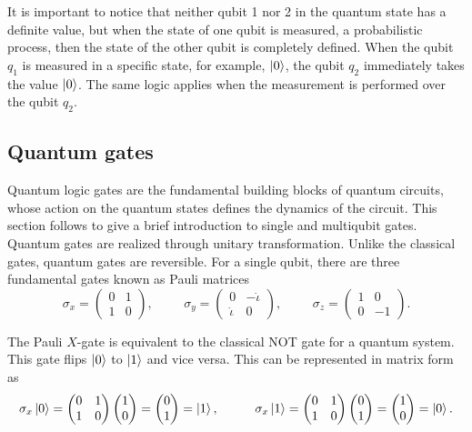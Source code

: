 \documentclass[10pt]{article}
\begin{document}
	It is important to notice that neither qubit 1 nor 2 in the quantum state has a definite value, but when the state of one qubit is measured, a probabilistic process, then the state of the other qubit is completely defined. When the qubit $q_1$ is measured in a specific state, for example, $\ket{0}$, the qubit $q_2$ immediately takes the value $\ket{0}$. The same logic applies when the measurement is performed over the qubit $q_2$.
	\subsection{\label{app: Quantum gates}Quantum gates}
	Quantum logic gates are the fundamental building blocks of quantum circuits,  whose action on the quantum states defines the dynamics of the circuit. This section follows \citet{Schuld2021QML} to give a brief introduction to single and multiqubit gates.
	Quantum gates are realized through unitary transformation. Unlike the classical gates, quantum gates are reversible.  For a single qubit, there are three fundamental gates  known as Pauli matrices
	\begin{equation}
		\sigma_{x}=\begin{pmatrix}
			0&1\\
			1&0
		\end{pmatrix} , \hspace{1cm}     \sigma_{y}=\begin{pmatrix}
			0&-\dot{\iota}\\
			\dot{\iota}&0
		\end{pmatrix}, \hspace{1cm} \sigma_{z}=\begin{pmatrix}
			1&0\\
			0&-1
		\end{pmatrix}.
	\end{equation}
	
	
	The  Pauli $X$-gate is equivalent to the classical NOT gate for a quantum system.  This gate flips $\ket{0}$ to $\ket{1}$ and vice versa. This can be represented in matrix form as
	\begin{equation}
		\sigma_{x}\ket{0}=\begin{pmatrix}
			0&1\\
			1&0
		\end{pmatrix}\begin{pmatrix}
			1\\0
		\end{pmatrix}=\begin{pmatrix}
			0\\1
		\end{pmatrix}=\ket{1}, \hspace{1cm}
		\sigma_{x}\ket{1}=\begin{pmatrix}
			0&1\\
			1&0
		\end{pmatrix}\begin{pmatrix}
			0\\1
		\end{pmatrix}=\begin{pmatrix}
			1\\0
		\end{pmatrix}=\ket{0}.
	\end{equation}
	
\end{document}
